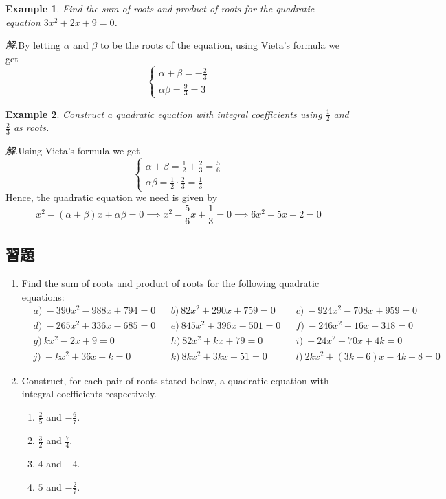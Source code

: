 \documentclass[12pt]{article}
\newtheorem{example}{Example}
\begin{document}
    \begin{example}
        Find the sum of roots and product of roots for the quadratic equation $3x^2+2x+9=0$.
    \end{example}

    \textit{ 解.}By letting $\alpha$ and $\beta$ to be the roots of the equation, using Vieta's formula we get $$\begin{cases}
        \alpha+\beta=-\frac{2}{3}\\ 
        \alpha\beta=\frac{9}{3}=3
    \end{cases}$$

    \begin{example}
        Construct a quadratic equation with integral coefficients using $\frac{1}{2}$ and $\frac{2}{3}$ as roots.
    \end{example}

    \textit{ 解.}Using Vieta's formula we get $$\begin{cases}
        \alpha+\beta=\frac{1}{2}+\frac{2}{3}=\frac{5}{6}\\ 
        \alpha\beta=\frac{1}{2}\cdot \frac{2}{3}=\frac{1}{3}
    \end{cases}$$
    \indent \indent Hence, the quadratic equation we need is given by $$x^2-(\alpha+\beta)x+\alpha\beta=0 \implies x^2-\frac{5}{6}x+\frac{1}{3}=0 \implies 6x^2-5x+2=0$$

    \subsection*{習題}
    \begin{enumerate}
        \item Find the sum of roots and product of roots for the following quadratic equations:\begin{align*}
            &a)\ -390x^2-988x+794=0&&b)\ 82x^2+290x+759=0&&c)\ -924x^2-708x+959=0\\
            &d)\ -265x^2+336x-685=0&&e)\ 845x^2+396x-501=0&&f)\ -246x^2+16x-318=0\\
            &g)\ kx^2-2x+9=0&&h)\ 82x^2+kx+79=0&&i)\ -24x^2-70x+4k=0\\
            &j)\ -kx^2+36x-k=0&&k)\ 8kx^2+3kx-51=0&&l)\ 2kx^2+(3k-6)x-4k-8=0
        \end{align*}
        \item Construct, for each pair of roots stated below, a quadratic equation with integral coefficients respectively.\begin{enumerate}
            \item $\frac{2}{5}$ and $-\frac{6}{7}$.
            \item $\frac{3}{2}$ and $\frac{7}{4}$.
            \item $4$ and $-4$.
            \item $5$ and $-\frac{2}{7}$.
        \end{enumerate}
    \end{enumerate}
\end{document}
